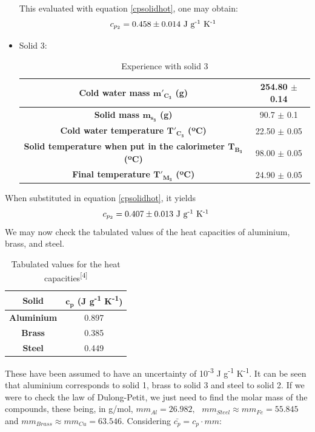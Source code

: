 \documentclass[a4paper, 12pt]{article}
\begin{document}
\begin{itemize}
\begin{table}[h!]
		\end{table}
	
		This evaluated with equation \ref{cpsolidhot}, one may obtain:
		\begin{equation*}\label{rsolid2}
			c_{p_2} = 0.458 \pm 0.014\mbox{ J g\textsuperscript{-1} K\textsuperscript{-1} }
		\end{equation*}
		\item Solid 3:\\
		
		\begin{table}[h!]
			\centering
			\caption{Experience with solid 3}
			\begin{tabular}{|c|c|}
				\hline
				\textbf{Cold water mass $\boldsymbol{m'_{C_3}}$ (g)} & 254.80 $\pm$ 0.14 \\
				\hline
				\textbf{Solid mass $\boldsymbol{m_{s_3}}$ (g)} & 90.7 $\pm$ 0.1 \\
				\hline
				\hline
				\textbf{Cold water temperature $\boldsymbol{T'_{C_3}}$ (ºC)} & 22.50 $\pm$ 0.05 \\
				\hline
				\textbf{Solid temperature when put in the calorimeter $\boldsymbol{T_{B_3}}$ (ºC)} & 98.00 $\pm$ 0.05 \\
				\hline
				\textbf{Final temperature $\boldsymbol{T'_{M_3}}$ (ºC)} & 24.90 $\pm$ 0.05 \\
				\hline
			\end{tabular}
			
		\end{table}
	\end{itemize}


	When substituted in equation \ref{cpsolidhot}, it yields
	\begin{equation*}\label{rsolid3}
		c_{p_2} = 0.407 \pm 0.013 \mbox{ J g\textsuperscript{-1} K\textsuperscript{-1} }
	\end{equation*}
	We may now check the tabulated values of the heat capacities of aluminium, brass, and steel.
	
	\begin{table}[h!]
		\centering
			\caption{Tabulated values for the heat capacities\textsuperscript{[4]}}
		\begin{tabular}{|c|c|}
			\hline
			\textbf{Solid} & $\boldsymbol{c_p}$ \textbf{(J g\textsuperscript{-1} K\textsuperscript{-1}})\\
			\hline
			\textbf{Aluminium} & 0.897 \\
			\textbf{Brass} & 0.385 \\
			\textbf{Steel} & 0.449 \\
			\hline
		\end{tabular}

	\end{table}
	These have been assumed to have an uncertainty of 10\textsuperscript{-3} J g\textsuperscript{-1} K\textsuperscript{-1}. It can be seen that aluminium corresponds to solid 1, brass to solid 3 and steel to solid 2.
	If we were to check the law of Dulong-Petit, we just need to find the molar mass of the compounds, these being, in g/mol, $mm_{Al} = 26.982,\mbox{ } mm_{Steel} \approx mm_{Fe} = 55.845 $ and $mm_{Brass} \approx mm_{Cu} = 63.546$. Considering $\bar{c_p} = c_p \cdot mm$:
	
\end{document}
